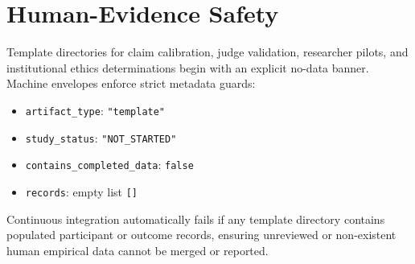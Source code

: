 \section{Human-Evidence Safety}
Template directories for claim calibration, judge validation, researcher pilots, and institutional ethics determinations begin with an explicit no-data banner. Machine envelopes enforce strict metadata guards:
\begin{itemize}
    \setlength{\itemsep}{0pt}\setlength{\parskip}{0pt}
    \item \texttt{artifact\_type}: \texttt{"template"}
    \item \texttt{study\_status}: \texttt{"NOT\_STARTED"}
    \item \texttt{contains\_completed\_data}: \texttt{false}
    \item \texttt{records}: empty list \texttt{[]}
\end{itemize}
Continuous integration automatically fails if any template directory contains populated participant or outcome records, ensuring unreviewed or non-existent human empirical data cannot be merged or reported.
